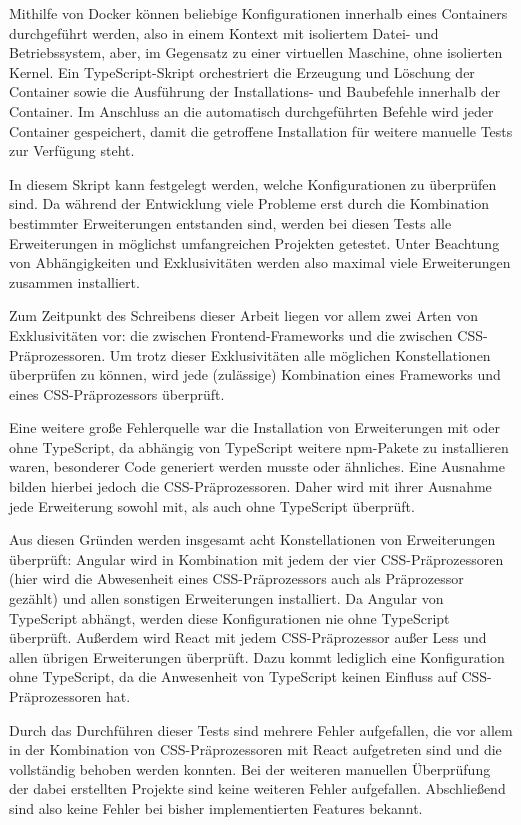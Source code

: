 Mithilfe von Docker können beliebige Konfigurationen innerhalb eines Containers durchgeführt werden, also in einem Kontext mit isoliertem Datei- und Betriebssystem, aber, im Gegensatz zu einer virtuellen Maschine, ohne isolierten Kernel. Ein TypeScript-Skript orchestriert die Erzeugung und Löschung der Container sowie die Ausführung der Installations- und Baubefehle innerhalb der Container. Im Anschluss an die automatisch durchgeführten Befehle wird jeder Container gespeichert, damit die getroffene Installation für weitere manuelle Tests zur Verfügung steht.

In diesem Skript kann festgelegt werden, welche Konfigurationen zu überprüfen sind. Da während der Entwicklung viele Probleme erst durch die Kombination bestimmter Erweiterungen entstanden sind, werden bei diesen Tests alle Erweiterungen in möglichst umfangreichen Projekten getestet. Unter Beachtung von Abhängigkeiten und Exklusivitäten werden also maximal viele Erweiterungen zusammen installiert.

Zum Zeitpunkt des Schreibens dieser Arbeit liegen vor allem zwei Arten von Exklusivitäten vor: die zwischen Frontend-Frameworks und die zwischen CSS-Präprozessoren. Um trotz dieser Exklusivitäten alle möglichen Konstellationen überprüfen zu können, wird jede (zulässige) Kombination eines Frameworks und eines CSS-Präprozessors überprüft.

Eine weitere große Fehlerquelle war die Installation von Erweiterungen mit oder ohne TypeScript, da abhängig von TypeScript weitere \gls{npm}-Pakete zu installieren waren, besonderer Code generiert werden musste oder ähnliches. Eine Ausnahme bilden hierbei jedoch die CSS-Präprozessoren. Daher wird mit ihrer Ausnahme jede Erweiterung sowohl mit, als auch ohne TypeScript überprüft.

Aus diesen Gründen werden insgesamt acht Konstellationen von Erweiterungen überprüft: Angular wird in Kombination mit jedem der vier CSS-Präprozessoren (hier wird die Abwesenheit eines CSS-Präprozessors auch als Präprozessor gezählt) und allen sonstigen Erweiterungen installiert. Da Angular von TypeScript abhängt, werden diese Konfigurationen nie ohne TypeScript überprüft. Außerdem wird React mit jedem CSS-Präprozessor außer Less und allen übrigen Erweiterungen überprüft. Dazu kommt lediglich eine Konfiguration ohne TypeScript, da die Anwesenheit von TypeScript keinen Einfluss auf CSS-Präprozessoren hat.

Durch das Durchführen dieser Tests sind mehrere Fehler aufgefallen, die vor allem in der Kombination von CSS-Präprozessoren mit React aufgetreten sind und die vollständig behoben werden konnten. Bei der weiteren manuellen Überprüfung der dabei erstellten Projekte sind keine weiteren Fehler aufgefallen. Abschließend sind also keine Fehler bei bisher implementierten Features bekannt.

